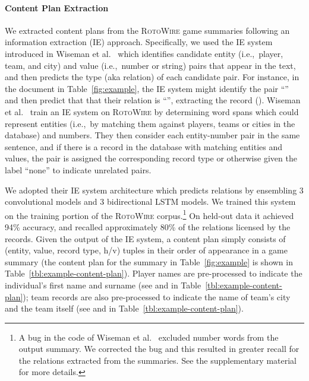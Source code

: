 \documentclass[letterpaper]{article} \usepackage{aaai19}  \usepackage{times}  \usepackage{helvet}  \usepackage{courier}  \usepackage{url}  \usepackage{graphicx}  \frenchspacing  \setlength{\pdfpagewidth}{8.5in}  \setlength{\pdfpageheight}{11in}  \graphicspath{ {images/} }
\newcommand{\lform}[1]{\textsf{\fontsize{7.5pt}{.1pt}\selectfont{#1}}}
\begin{document}
\paragraph{Content Plan Extraction}

We extracted content plans from the \textsc{RotoWire} game summaries
following an information extraction (IE) approach. Specifically, we
used the IE system introduced in Wiseman et
al.~ which identifies candidate
entity (i.e.,~player, team, and city) and value (i.e.,~number or
string) pairs that appear in the text, and then predicts the type (aka
relation) of each candidate pair. For instance, in the document in
Table~\ref{fig:example}, the IE system might identify the pair
``\lform{\small Jeff Teague, 20}'' and then predict that that their
relation is ``\lform{\small PTS}'', extracting the record
(\lform{\small Jeff Teague, 20, PTS}). Wiseman et
al.~ train an IE system on
\textsc{RotoWire} by determining word spans which could represent
entities (i.e.,~by matching them against players, teams or cities in
the database) and numbers. They then consider each entity-number pair
in the same sentence, and if there is a record in the database with
matching entities and values, the pair is assigned the corresponding
record type or otherwise given the label ``none'' to indicate
unrelated pairs.

We adopted their IE system architecture which predicts relations by
ensembling 3 convolutional models and 3 bidirectional LSTM models. We
trained this system on the training portion of the \textsc{RotoWire}
corpus.\footnote{A bug in the code of Wiseman et
  al.~ excluded number words
  from the output summary. We corrected the bug and this resulted in
  greater recall for the relations extracted from the summaries. See
  the supplementary material for more details.}  On held-out data it
achieved 94\% accuracy, and recalled approximately 80\% of the
relations licensed by the records. Given the output of the IE system,
a content plan simply consists of (entity, value, record type, h/v)
tuples in their order of appearance in a game summary (the content
plan for the summary in Table~\ref{fig:example} is shown in
Table~\ref{tbl:example-content-plan}).  Player names are pre-processed
to indicate the individual's first name and surname (see \lform{\small
  Isaiah} and \lform{\small Thomas} in
Table~\ref{tbl:example-content-plan}); team records are also
pre-processed to indicate the name of team's city and the team itself
(see \lform{\small Boston} and \lform{\small Celtics} in
Table~\ref{tbl:example-content-plan}).
\end{document}
